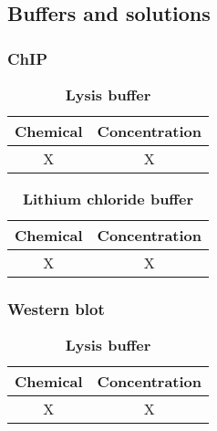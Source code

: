 \documentclass[11pt,twoside,a4paper]{report}
\begin{document}
		\subsection{Buffers and solutions}
			\subsubsection{ChIP}
				\begin{table}[!ht]
       			\caption{
            			\bf{Lysis buffer}
            		}
	        		\begin{center}
    		        		\begin{tabular}{|c|c|}
        		        		\hline
	        		        Chemical & Concentration\\
    		        		    \hline
						X & X\\
		                \hline
		            \end{tabular}
    			    \end{center}
			    \end{table}
			    
			    \begin{table}[!ht]
       			\caption{
            			\bf{Lithium chloride buffer}
            		}
	        		\begin{center}
    		        		\begin{tabular}{|c|c|}
        		        		\hline
	        		        Chemical & Concentration\\
    		        		    \hline
						X & X\\
		                \hline
		            \end{tabular}
    			    \end{center}
			    \end{table}
			    
			    \subsubsection{Western blot}
				\begin{table}[!ht]
       			\caption{
            			\bf{Lysis buffer}
            		}
	        		\begin{center}
    		        		\begin{tabular}{|c|c|}
        		        		\hline
	        		        Chemical & Concentration\\
    		        		    \hline
						X & X\\
		                \hline
		            \end{tabular}
    			    \end{center}
			    \end{table}
		    		    
\end{document}
